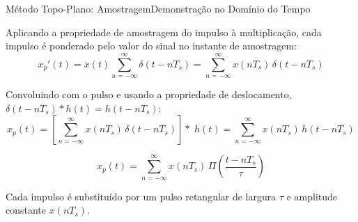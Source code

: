 \begin{frame}{Método Topo-Plano: Amostragem}{Demonstração no Domínio do Tempo}
  \small

  Aplicando a propriedade de amostragem do impulso à multiplicação, cada
  impulso é ponderado pelo valor do sinal no instante de amostragem:
  \begin{equation*}
    x_p'(t) = x(t)\sum_{n=-\infty}^{\infty}\delta(t - nT_s)
      = \sum_{n=-\infty}^{\infty} x(nT_s)\,\delta(t - nT_s)
  \end{equation*}

  Convoluindo com o pulso e usando a propriedade de deslocamento,
  $\delta(t - nT_s) * h(t) = h(t - nT_s)$:
  \begin{equation*}
    x_p(t) = \left[\sum_{n=-\infty}^{\infty} x(nT_s)\,
      \delta(t - nT_s)\right] *\; h(t)
    = \sum_{n=-\infty}^{\infty} x(nT_s)\, h(t - nT_s)
  \end{equation*}

  \vspace{-0.2em}
  \begin{equation}
    \boxed{\;
      x_p(t) = \sum_{n=-\infty}^{\infty} x(nT_s)\,
      \Pi\!\left(\frac{t - nT_s}{\tau}\right)
    \;}
    \label{eq: sinal_amostrado_flattop_tempo}
  \end{equation}

  \vspace{0.2em}
  Cada impulso é substituído por um pulso retangular de largura $\tau$ e
  amplitude constante $x(nT_s)$.

\end{frame}

